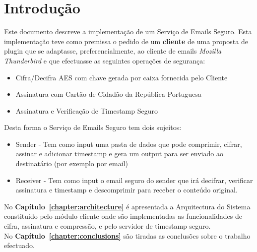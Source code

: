 \chapter{Introdução}
\label{chapter:introduction}
Este documento descreve a implementação de um Serviço de Emails Seguro. Esta implementação teve como premissa o pedido de um \textbf{cliente} de uma proposta de plugin que se adaptasse, preferencialmente, ao cliente de emails \textit{Mozilla Thunderbird} e que efectuasse as seguintes operações de segurança:
\begin{itemize}
\item Cifra/Decifra AES com chave gerada por caixa fornecida pelo Cliente
\item Assinatura com Cartão de Cidadão da República Portuguesa
\item Assinatura e Verificação de Timestamp Seguro
\end{itemize}

Desta forma o Serviço de Emails Seguro tem dois sujeitos:
\begin{itemize}
\item Sender -  Tem como input uma pasta de dados que pode comprimir, cifrar, assinar e adicionar timestamp 
e gera um output para ser enviado ao destinatário (por exemplo por email)
\item Receiver - Tem como input o email seguro do sender que irá decifrar, verificar assinatura e timestamp 
e descomprimir para receber o conteúdo original.
\end{itemize}
No \textbf{Capítulo~\ref{chapter:architecture}} é apresentada  a Arquitectura do Sistema constituido pelo módulo cliente onde são implementadas as funcionalidades de cifra, assinatura e compressão, e pelo servidor de timestamp seguro.\\
No \textbf{Capítulo~\ref{chapter:conclusions}} são tiradas as conclusões sobre o trabalho efectuado.
\newpage




